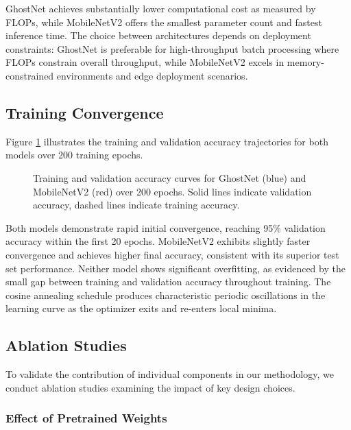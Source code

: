 \documentclass[11pt,a4paper]{article}
\begin{document}
GhostNet achieves substantially lower computational cost as measured by FLOPs, while MobileNetV2 offers the smallest parameter count and fastest inference time. The choice between architectures depends on deployment constraints: GhostNet is preferable for high-throughput batch processing where FLOPs constrain overall throughput, while MobileNetV2 excels in memory-constrained environments and edge deployment scenarios.

\subsection{Training Convergence}

Figure \ref{fig:training_curves} illustrates the training and validation accuracy trajectories for both models over 200 training epochs.

\begin{figure}[htbp]
\centering
\caption{Training and validation accuracy curves for GhostNet (blue) and MobileNetV2 (red) over 200 epochs. Solid lines indicate validation accuracy, dashed lines indicate training accuracy.}
\label{fig:training_curves}
\end{figure}

Both models demonstrate rapid initial convergence, reaching 95\% validation accuracy within the first 20 epochs. MobileNetV2 exhibits slightly faster convergence and achieves higher final accuracy, consistent with its superior test set performance. Neither model shows significant overfitting, as evidenced by the small gap between training and validation accuracy throughout training. The cosine annealing schedule produces characteristic periodic oscillations in the learning curve as the optimizer exits and re-enters local minima.

\subsection{Ablation Studies}

To validate the contribution of individual components in our methodology, we conduct ablation studies examining the impact of key design choices.

\subsubsection{Effect of Pretrained Weights}
\end{document}
